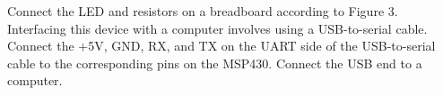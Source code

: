 
Connect the LED and resistors on a breadboard according to Figure 3.
\\
Interfacing this device with a computer involves using a USB-to-serial cable. Connect the +5V, GND, RX, and TX on the UART side of the USB-to-serial cable to the corresponding pins on the MSP430. Connect the USB end to a computer.
